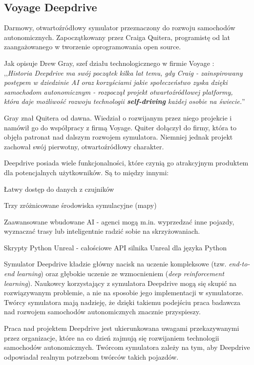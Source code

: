 \subsection{Voyage Deepdrive}
Darmowy, otwartoźródłowy symulator przeznaczony do rozwoju samochodów autonomicznych. Zapoczątkowany przez Craiga Quitera, programistę od lat zaangażowanego w tworzenie oprogramowania open source.

Jak opisuje Drew Gray, szef działu technologicznego \cite{investopedia:CTO} w firmie Voyage \cite{voyage:introducingDeepdrive}: \\
,,\textit{Historia Deepdrive ma swój początek kilka lat temu, gdy Craig - zainspirowany postępem w dziedzinie AI oraz korzyściami jakie społeczeństwo zyska dzięki samochodom autonomicznym - rozpoczął projekt otwartoźródłowej platformy, która daje możliwość rozwoju technologii \textbf{self-driving} każdej osobie na świecie.}''

Gray znał Quitera od dawna. Wiedział o rozwijanym przez niego projekcie i namówił go do współpracy z firmą Voyage. Quiter dołączył do firmy, która to objęła patronat nad dalszym rozwojem symulatora. Niemniej jednak projekt zachował swój pierwotny, otwartoźródłowy charakter.

Deepdrive posiada wiele funkcjonalności, które czynią go atrakcyjnym produktem dla potencjalnych użytkowników. Są to między innymi:
\begin{itemize*}
\item Łatwy dostęp do danych z czujników
\item Trzy zróżnicowane środowiska symulacyjne (mapy)
\item Zaawansowane wbudowane AI - agenci mogą m.in. wyprzedzać inne pojazdy, wyznaczać trasy lub inteligentnie radzić sobie na skrzyżowaniach.
\item Skrypty Python Unreal - całościowe API silnika Unreal \cite{unrealEngine:features} dla języka Python
\end{itemize*}

Symulator Deepdrive kładzie główny nacisk na uczenie kompleksowe (tzw. \textit{end-to-end learning}) oraz głębokie uczenie ze wzmocnieniem (\textit{deep reinforcement learning}). Naukowcy korzystający z symulatora Deepdrive mogą się skupić na rozwiązywanym problemie, a nie na sposobie jego implementacji w symulatorze. Twórcy symulatora mają nadzieję, że dzięki takiemu podejściu praca badawcza nad rozwojem samochodów autonomicznych znacznie przyspieszy.

Praca nad projektem Deepdrive jest ukierunkowana uwagami przekazywanymi przez organizacje, które na co dzień zajmują się rozwijaniem technologii samochodów autonomicznych. Twórcom symulatora zależy na tym, aby Deepdrive odpowiadał realnym potrzebom twórców takich pojazdów.

